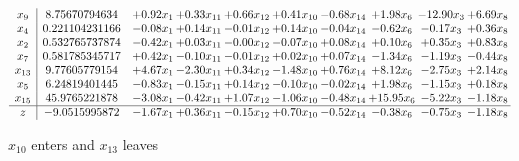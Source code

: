 \documentclass[9pt]{article}
\begin{document}
 \[\begin{array}{c| c c@{\hskip 2pt} c@{\hskip 2pt} c@{\hskip 2pt} c@{\hskip 2pt} c@{\hskip 2pt} c@{\hskip 2pt} c@{\hskip 2pt} c@{\hskip 2pt} }
 x_{9}   &  8.75670794634 & +  0.92 x_{1} & +  0.33 x_{11} & +  0.66 x_{12} & +  0.41 x_{10} & -0.68 x_{14} & +  1.98 x_{6} & -12.90 x_{3} & +  6.69 x_{8}\\
 x_{4}   &  0.221104231166 & -0.08 x_{1} & +  0.14 x_{11} & -0.01 x_{12} & +  0.14 x_{10} & -0.04 x_{14} & -0.62 x_{6} & -0.17 x_{3} & +  0.36 x_{8}\\
 x_{2}   &  0.532765737874 & -0.42 x_{1} & +  0.03 x_{11} & -0.00 x_{12} & -0.07 x_{10} & +  0.08 x_{14} & +  0.10 x_{6} & +  0.35 x_{3} & +  0.83 x_{8}\\
 x_{7}   &  0.581785345717 & +  0.42 x_{1} & -0.10 x_{11} & -0.01 x_{12} & +  0.02 x_{10} & +  0.07 x_{14} & -1.34 x_{6} & -1.19 x_{3} & -0.44 x_{8}\\
 x_{13}   &  9.77605779154 & +  4.67 x_{1} & -2.30 x_{11} & +  0.34 x_{12} & -1.48 x_{10} & +  0.76 x_{14} & +  8.12 x_{6} & -2.75 x_{3} & +  2.14 x_{8}\\
 x_{5}   &  6.24819401445 & -0.83 x_{1} & -0.15 x_{11} & +  0.14 x_{12} & -0.10 x_{10} & -0.02 x_{14} & +  1.98 x_{6} & -1.15 x_{3} & +  0.18 x_{8}\\
 x_{15}   &  45.9765221878 & -3.08 x_{1} & -0.42 x_{11} & +  1.07 x_{12} & -1.06 x_{10} & -0.48 x_{14} & + 15.95 x_{6} & -5.22 x_{3} & -1.18 x_{8}\\
\hline
z    &  -9.0515995872 & -1.67 x_{1} & +  0.36 x_{11} & -0.15 x_{12} & +  0.70 x_{10} & -0.52 x_{14} & -0.38 x_{6} & -0.75 x_{3} & -1.18 x_{8}\\
\end{array}\]


 $ x_{10} $ enters and $ x_{13} $ leaves 
\end{document}

